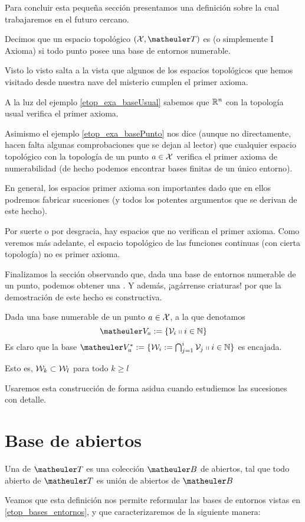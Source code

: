 Para concluir esta pequeña sección presentamos una definición sobre la cual trabajaremos en el futuro cercano.
\begin{defi}
	Decimos que un espacio topológico $(\X,\T)$ es  (o simplemente I Axioma) si todo punto posee una base de entornos numerable.
\end{defi}
Visto lo visto salta a la vista que algunos de los espacios topológicos que hemos visitado desde nuestra nave del misterio cumplen el primer axioma.
\begin{exa}
	A la luz del ejemplo \ref{etop_exa_baseUsual} sabemos que $\mathbb{R}^n$ con la topología usual verifica el primer axioma.
	
	Asimismo el ejemplo \ref{etop_exa_basePunto} nos dice (aunque no directamente, hacen falta algunas comprobaciones que se dejan al lector) que cualquier espacio topológico con la topología de un punto $a\in\mathcal{X}$ verifica el primer axioma de numerabilidad (de hecho podemos encontrar bases finitas de un único entorno).
\end{exa}
En general, los espacios primer axioma son importantes dado que en ellos podremos fabricar sucesiones (y todos los potentes argumentos que se derivan de este hecho).

Por suerte o por desgracia, hay espacios que no verifican el primer axioma. Como veremos más adelante, el espacio topológico de las funciones continuas (con cierta topología) no es primer axioma.

Finalizamos la sección observando que, dada una base de entornos numerable de un punto, podemos obtener una . Y además, ¡agárrense criaturas! por que la demostración de este hecho es constructiva.
\begin{obs}
	Dada una base numerable de un punto $a\in\mathcal{X}$, a la que denotamos
	\begin{equation*}
		\Va{a}:=\{\V_i\tq i\in\N\}
	\end{equation*}
	Es claro que la base $\Va{a}^*:=\{\W_i:=\bigcap_{j=1}^i\V_j\tq i\in\N\}$ es encajada.
	
	Esto es, $\mathcal{W}_k\subset\mathcal{W}_l$ para todo $k\geq l$
\end{obs}
Usaremos esta construcción de forma asidua cuando estudiemos las sucesiones con detalle.
\section{Base de abiertos}
\begin{defi}
	\label{etop_bases_abiertos}
	Una  de $\T$ es una colección $\B$ de abiertos, tal que todo abierto de $\T$ es unión de abiertos de $\B$
\end{defi}
Veamos que esta definición nos permite reformular las bases de entornos vistas en \eqref{etop_bases_entornos}, y que caracterizaremos de la siguiente manera:


